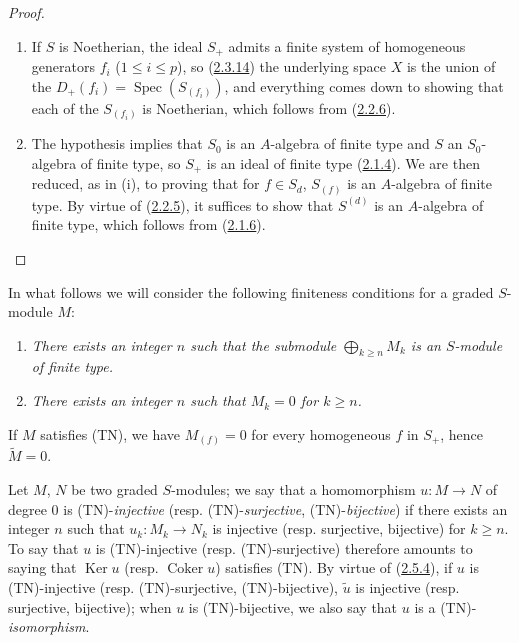 \begin{proof}
\begin{enumerate}
  \item[\rm(i)] If $S$ is Noetherian, the ideal $S_+$ admits a finite system of
    homogeneous generators $f_i$ ($1\leq i\leq p$), so
    (\hyperref[II.2.3.14]{2.3.14}) the underlying space $X$ is the union of
    the $D_+(f_i)=\operatorname{Spec}(S_{(f_i)})$, and everything comes down to
    showing that each of the $S_{(f_i)}$ is Noetherian, which follows from
    (\hyperref[II.2.2.6]{2.2.6}).
  \item[\rm(ii)] The hypothesis implies that $S_0$ is an $A$-algebra of finite
    type and $S$ an $S_0$-algebra of finite type, so $S_+$ is an ideal of
    finite type (\hyperref[II.2.1.4]{2.1.4}). We are then reduced, as in
    (i), to proving that for $f\in S_d$, $S_{(f)}$ is an $A$-algebra of finite
    type. By virtue of (\hyperref[II.2.2.5]{2.2.5}), it suffices to show
    that $S^{(d)}$ is an $A$-algebra of finite type, which follows from
    (\hyperref[II.2.1.6]{2.1.6}).
\end{enumerate}
\end{proof}

\begin{env}[2.7.2]
\label{II.2.7.2}
In what follows we will consider the following finiteness conditions for
a graded $S$-module $M$:
\begin{enumerate}
  \item[\rm(TF)] \emph{There exists an integer $n$ such that the submodule
    $\bigoplus_{k\geq n}M_k$ is an $S$-module of finite type.}
  \item[\rm(TN)] \emph{There exists an integer $n$ such that $M_k=0$ for $k\geq n$.}
\end{enumerate}

If $M$ satisfies (TN), we have $M_{(f)}=0$ for every homogeneous $f$ in $S_+$,
hence $\widetilde{M}=0$.

Let $M$, $N$ be two graded $S$-modules; we say that a homomorphism
$u:M\to N$ of degree $0$ is (TN)-\emph{injective} (resp.
(TN)-\emph{surjective}, (TN)-\emph{bijective}) if there exists an integer $n$
such that $u_k:M_k\to N_k$ is injective (resp. surjective, bijective) for
$k\geq n$. To say that $u$ is (TN)-injective (resp. (TN)-surjective) therefore
amounts to saying that $\operatorname{Ker}u$ (resp. $\operatorname{Coker}u$)
satisfies (TN). By virtue of (\hyperref[II.2.5.4]{2.5.4}), if $u$ is
(TN)-injective (resp. (TN)-surjective, (TN)-bijective), $\widetilde{u}$ is
injective (resp. surjective, bijective); when $u$ is (TN)-bijective, we also
say that $u$ is a (TN)-\emph{isomorphism}.
\end{env}

